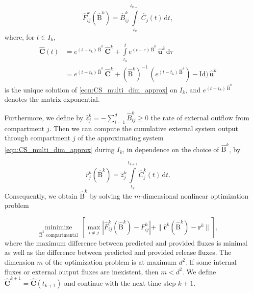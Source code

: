 \documentclass[draft]{agujournal2019}
\renewcommand{\vec}[1]{\mathbf{#1}}
\newcommand{\tens}[1]{\mathrm{#1}}
\newcommand{\id}{\tens{Id}}
\newcommand{\dd}[1]{\,\mathrm{d}#1}
\newcommand{\intl}{\int\limits}
\begin{document}
        \begin{equation*}
            \widehat{F}^k_{ij}(\widehat{\tens{B}}^k) = \widehat{B}^k_{ij}\intl_{t_k}^{t_{k+1}} \widehat{C}_j(t)\dd{t},
        \end{equation*}
        where, for $t\in I_k$,
        \begin{align*}
            \widehat{\vec{C}}(t) &= e^{(t-t_k)\,\widehat{\tens{B}}^k}\,\widehat{\vec{C}}^k + \intl_{t_k}^t e^{(t-\tau)\,\widehat{\tens{B}}^k}\,\widehat{\vec{u}}^k\dd{\tau}\\
            &= e^{(t-t_k)\,\widehat{\tens{B}}^k}\,\widehat{\vec{C}}^k + (\widehat{\tens{B}}^k)^{-1}\,(e^{(t-t_k)\,\widehat{\tens{B}}^k})-\id)\,\widehat{\vec{u}}^k
        \end{align*}
        is the unique solution of \eqref{eqn:CS_multi_dim_approx} on $I_k$, and $e^{(t-t_k)\,\widehat{\tens{B}}^k}$ denotes the matrix exponential.

        Furthermore, we define by $\widehat{z}^k_j=-\sum_{i=1}^d \widehat{B}^k_{ij} \geq 0$ the rate of external outflow from compartment $j$.
        Then we can compute the cumulative external system output through compartment $j$ of the approximating system \eqref{eqn:CS_multi_dim_approx} during $I_k$, in dependence on the choice of $\widehat{\tens{B}}^k$, by
        
        \begin{equation*}
            \widehat{r}^k_j(\widehat{\tens{B}}^k) = \widehat{z}^k_j\intl_{t_k}^{t_{k+1}} \widehat{C}^k_j(t)\dd{t}.
        \end{equation*}
        Consequently, we obtain $\widehat{\tens{B}}^k$ by solving the $m$-dimensional nonlinear optimization problem
        
        \begin{equation*}
            \underset{\widehat{\tens{B}}^k\text{ compartmental}}{\operatorname{minimize}}\,\left[\max\limits_{i\neq j} |\widehat{F}^k_{ij}(\widehat{\tens{B}}^k)-F^k_{ij}| + \|\widehat{\vec{r}}^k(\widehat{\tens{B}}^k)-\vec{r}^k \| \right],
        \end{equation*}
        where the maximum difference between predicted and provided fluxes is minimal as well as the difference between predicted and provided release fluxes. 
        The dimension $m$ of the optimization problem is at maximum $d^2$.
        If some internal fluxes or external output fluxes are inexistent, then $m<d^2$.
        We define $\widehat{\vec{C}}^{k+1}=\widehat{\vec{C}}(t_{k+1})$ and continue with the next time step $k+1$.\\
       
\end{document}
